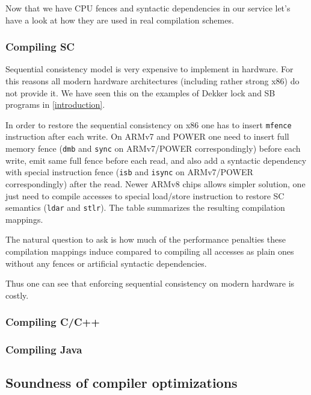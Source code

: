 \documentclass[a4paper,twoside,11pt]{article}
\numberwithin{equation}{section}
\begin{document}
Now that we have CPU fences and syntactic dependencies in our service
let's have a look at how they are used in real compilation schemes.

\subsubsection{Compiling SC}

Sequential consistency model is very expensive to implement in hardware. 
For this reasons all modern hardware architectures (including rather strong x86) do not provide it. 
We have seen this on the examples of Dekker lock and SB programs in \ref{introduction}.

In order to restore the sequential consistency on x86 one has to 
insert \texttt{mfence} instruction after each write.
On ARMv7 and POWER one need to insert full memory fence
(\texttt{dmb} and \texttt{sync} on ARMv7/POWER correspondingly)
before each write,
emit same full fence before each read, and also
add a syntactic dependency with special instruction fence 
(\texttt{isb} and \texttt{isync} on ARMv7/POWER correspondingly)
after the read.
Newer ARMv8 chips allows simpler solution, 
one just need to compile accesses to special 
load/store instruction to restore SC semantics
(\texttt{ldar} and \texttt{stlr}).
The table summarizes the resulting compilation mappings.


The natural question to ask is how much of the performance penalties
these compilation mappings induce compared to compiling all accesses as plain ones
without any fences or artificial syntactic dependencies.


Thus one can see that enforcing sequential consistency on modern hardware is costly.

\subsubsection{Compiling C/C++}

\subsubsection{Compiling Java}


\subsection{Soundness of compiler optimizations}
\end{document}
